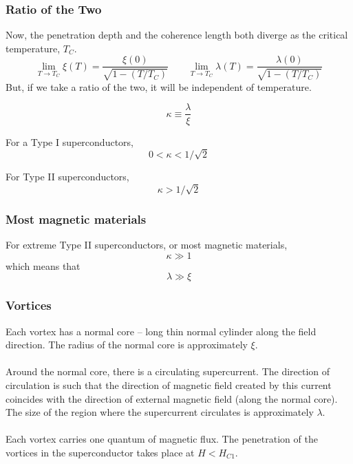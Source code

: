 \documentclass[10pt]{beamer}
\theoremstyle{definition}
\begin{document}
\begin{frame}[<+->]
    \frametitle{Ratio of the Two}

    Now, the penetration depth and the coherence length both diverge as the
    critical temperature, $T_C$.
    \begin{equation}
        \lim_{T\rightarrow T_C} \xi(T) = \frac{\xi(0)}{\sqrt{1-(T/T_C)}} \qquad
        \lim_{T\rightarrow T_C} \lambda(T) = \frac{\lambda(0)}{\sqrt{1-(T/T_C)}}
    \end{equation}
    But, if we take a ratio of the two, it will be independent of temperature.

    \begin{equation}
        \kappa \equiv \frac{\lambda}{\xi}
    \end{equation}

    For a Type I superconductors,
    \begin{equation}
       0 < \kappa < 1/\sqrt{2}
    \end{equation}

    For Type II superconductors,
    \begin{equation}
        \kappa > 1/\sqrt{2}
    \end{equation}


\end{frame}

\begin{frame}[<+->]
    \frametitle{Most magnetic materials}
    For extreme Type II superconductors, or most magnetic materials,
    \begin{equation}
        \kappa \gg 1
    \end{equation}
    which means that
    \begin{equation}
        \lambda \gg \xi
    \end{equation}

\end{frame}

\begin{frame}
    \frametitle{Vortices}

    Each vortex has a normal core -- long thin normal cylinder along the field direction.
    The radius of the normal core is approximately $\xi$.
    \\~\\
    Around the normal core, there is a circulating supercurrent. The direction of 
    circulation is such that the direction of magnetic field created by this current coincides
    with the direction of external magnetic field (along the normal core). The size of the
    region where the supercurrent circulates is approximately $\lambda$.
    \\~\\

    Each vortex carries one quantum of magnetic flux.
    The penetration of the vortices in the superconductor takes place at
    $H<H_{C1}$.


\end{frame}
\end{document}
